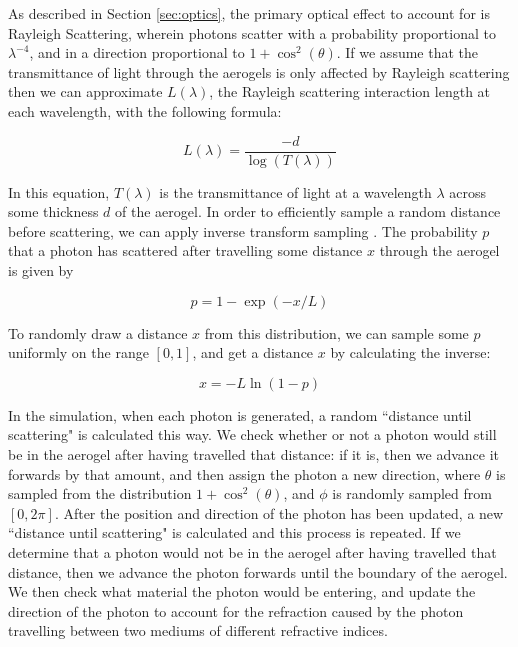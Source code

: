 As described in Section \ref{sec:optics}, the primary optical effect to account for is Rayleigh Scattering, wherein photons scatter with a probability proportional to $\lambda^{-4}$, and in a direction proportional to $1 + \cos^2(\theta)$.
If we assume that the transmittance of light through the aerogels is only affected by Rayleigh scattering then we can approximate $L(\lambda)$, the Rayleigh scattering interaction length at each wavelength, with the following formula:

\begin{equation}
L(\lambda) = \frac{-d}{\log(T(\lambda))}
    \label{eq:scatLength}
\end{equation}

In this equation, $T(\lambda)$ is the transmittance of light at a wavelength $\lambda$ across some thickness $d$ of the aerogel.
In order to efficiently sample a random distance before scattering, we can apply inverse transform sampling .
The probability $p$ that a photon has scattered after travelling some distance $x$ through the aerogel is given by

\begin{equation}
p = 1 - \exp(-x/L)
    \label{eq:scatProb}
\end{equation}

To randomly draw a distance $x$ from this distribution, we can sample some $p$ uniformly on the range $[0,1]$, and get a distance $x$ by calculating the inverse:

\begin{equation}
x =   -L\ln(1-p)
  \label{eq:randomScat}
\end{equation}

In the simulation, when each photon is generated, a random ``distance until scattering" is calculated this way. 
We check whether or not a photon would still be in the aerogel after having travelled that distance: if it is, then we advance it forwards by that amount, and then assign the photon a new direction, where $\theta$ is sampled from the distribution $1 + \cos^2(\theta)$, and $\phi$ is randomly sampled from $[0, 2\pi]$.
After the position and direction of the photon has been updated, a new ``distance until scattering" is calculated and this process is repeated. 
If we determine that a photon would not be in the aerogel after having travelled that distance, then we advance the photon forwards until the boundary of the aerogel.
We then check what material the photon would be entering, and update the direction of the photon to account for the refraction caused by the photon travelling between two mediums of different refractive indices.

